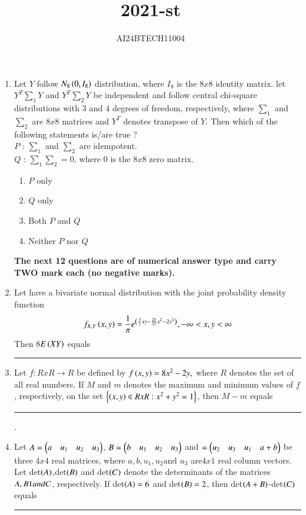 \documentclass[journal]{IEEEtran}
\begin{document}

\onecolumn
\newpage
\title{2021-st}
\author{AI24BTECH11004}
\maketitle

\begin{enumerate}
       \item Let $Y$ follow $N_8\brak{0,I_8}$ distribution, where $I_8$ is the $8x8$ identity matrix. let $Y^T\sum_1 Y$ and $Y^T\sum_2 Y$ be independent and follow central chi-square distributions with $3$ and $4$ degrees of freedom, respectively, where $\sum _1$ and $\sum_2$ are $8x8$ matrices and $Y^T$ denotes transpose of $Y$. Then which of the following statements is/are true  ?\\
       $P$ : $\sum_1$ and $\sum_2$ are idempotent.\\
       $Q$ : $\sum_1$$\sum_2=0$, where $0$ is the $8x8$ zero matrix.       
       \begin{enumerate}
           \item $P$ only
           \item $Q$ only 
           \item Both $P$ and $Q$
           \item Neither $P$ nor $Q$
       \end{enumerate}
\textbf{The next 12 questions are of numerical answer type and carry TWO mark each (no negative marks).}
       \item Let  have a bivariate normal distribution with the joint probability density function
            \begin{align*}
                f_{X,Y}\left(x,y\right)=\frac{1}{\pi}e^{\left(\frac{3}{2}xy-\frac{25}{32}x^2-2y^2\right)},-\infty<x,y<\infty            
            \end{align*}
            Then 8$E\brak{XY}$ equals \rule{1cm}{0.15mm}
       \item Let $f:RxR\rightarrow R$ be defined by $f\brak{x,y}=8x^2-2y,$ where $R$ denotes the set of all real numbers. If $M$ and $m$ denotes the maximum and minimum values of $f$, respectively, on the set $\cbrak{\brak{x,y}\in RxR:x^2 +y^2=1}$, then $M-m$ equals \rule{1cm}{0.15mm} .
	\item Let $A=\myvec{a &u_1&u_2&u_3}$, $B=\myvec{b &u_1&u_2&u_3}$ and $=\myvec{u_2&u_3&u_1&a+b}$ be three $4x4$ real matrices, where $a,b,u_1,u_2 \text{and } u_3$ are$4x1$ real column vectors. Let det$\brak{A}$,det$\brak{B}$ and det$\brak{C}$ denote the determinants of the matrices $A,B \text1{and }C$, respectively. If det$\brak{A}=6$ and det$\brak{B}=2$, then det$\brak{A+B}$-det$\brak{C}$ equals \rule{1cm}{0.15mm}  
$$
\end{enumerate}
\end{document}
